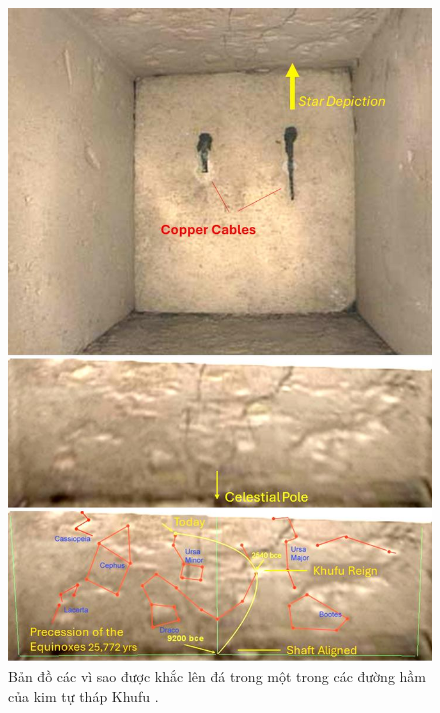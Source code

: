\documentclass[10pt,twocolumn,letterpaper]{article}
\begin{document}
\begin{figure}[H]
\begin{center}
   \includegraphics[width=1\linewidth]{star-stone.jpg}
\end{center}
   \caption{Bản đồ các vì sao được khắc lên đá trong một trong các đường hầm của kim tự tháp Khufu \cite{28}.}
\label{fig:20}
\label{fig:onecol}
\end{figure}
\end{document}
